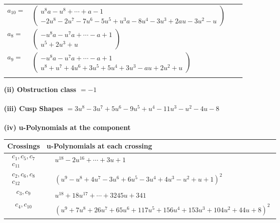 \documentclass[1p]{elsarticle_modified}
\theoremstyle{definition}
\begin{document}
\begin{tabular}{m{7pt} m{180pt} m{7pt} m{180pt} }
\flushright $a_{10}=$&$\begin{pmatrix}u^8 a- u^8+\cdots+a-1\\-2 u^8-2 u^7-7 u^6-5 u^5+u^3 a-8 u^4-3 u^3+2 a u-3 u^2- u\end{pmatrix}$ \\
\flushright $a_{8}=$&$\begin{pmatrix}- u^8 a- u^7 a+\cdots- a+1\\u^5+2 u^3+u\end{pmatrix}$ \\
\flushright $a_{9}=$&$\begin{pmatrix}- u^8 a- u^7 a+\cdots- a+1\\u^8+u^7+4 u^6+3 u^5+5 u^4+3 u^3- a u+2 u^2+u\end{pmatrix}$\\&\end{tabular}
\flushleft \textbf{(ii) Obstruction class $= -1$}\\~\\
\flushleft \textbf{(iii) Cusp Shapes $= 3 u^8-3 u^7+5 u^6-9 u^5+u^4-11 u^3- u^2-4 u-8$}\\~\\
\newpage\renewcommand{\arraystretch}{1}
\flushleft \textbf{(iv) u-Polynomials at the component}\newline \\
\begin{tabular}{m{50pt}|m{274pt}}
Crossings & \hspace{64pt}u-Polynomials at each crossing \\
\hline $$\begin{aligned}c_{1},c_{5},c_{7}\\c_{11}\end{aligned}$$&$\begin{aligned}
&u^{18}-2 u^{16}+\cdots+3 u+1
\end{aligned}$\\
\hline $$\begin{aligned}c_{2},c_{6},c_{8}\\c_{12}\end{aligned}$$&$\begin{aligned}
&(u^9- u^8+4 u^7-3 u^6+6 u^5-3 u^4+4 u^3- u^2+u+1)^2
\end{aligned}$\\
\hline $$\begin{aligned}c_{3},c_{9}\end{aligned}$$&$\begin{aligned}
&u^{18}+18 u^{17}+\cdots+3245 u+341
\end{aligned}$\\
\hline $$\begin{aligned}c_{4},c_{10}\end{aligned}$$&$\begin{aligned}
&(u^9+7 u^8+26 u^7+65 u^6+117 u^5+156 u^4+153 u^3+104 u^2+44 u+8)^{2}
\end{aligned}$\\
\hline
\end{tabular}\\~\\
\end{document}
